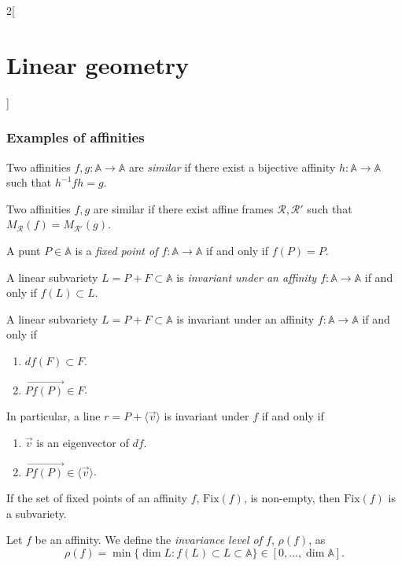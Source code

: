 \documentclass[class=article,10pt,crop=false]{standalone}
\begin{document}
\begin{multicols}{2}[\section{Linear geometry}]
\subsubsection*{Examples of affinities}
\begin{definition}
Two affinities $f,g:\mathbb{A}\rightarrow\mathbb{A}$ are \textit{similar} if there exist a bijective affinity $h:\mathbb{A}\rightarrow\mathbb{A}$ such that $h^{-1}fh=g$.
\end{definition}
\begin{prop}
Two affinities $f,g$ are similar if there exist affine frames $\mathcal{R},\mathcal{R}'$ such that $M_\mathcal{R}(f)=M_{\mathcal{R}'}(g)$.
\end{prop}
\begin{definition}
A punt $P\in\mathbb{A}$ is a \textit{fixed point of $f:\mathbb{A}\rightarrow\mathbb{A}$} if and only if $f(P)=P$.
\end{definition}
\begin{definition}
A linear subvariety $L=P+F\subset\mathbb{A}$ is \textit{invariant under an affinity $f:\mathbb{A}\rightarrow\mathbb{A}$} if and only if $f(L)\subset L$.
\end{definition}
\begin{prop}
A linear subvariety $L=P+F\subset\mathbb{A}$ is invariant under an affinity $f:\mathbb{A}\rightarrow\mathbb{A}$ if and only if
\begin{enumerate}
    \item $df(F)\subset F$.
    \item $\overrightarrow{Pf(P)}\in F$.
\end{enumerate} In particular, a line $r=P+\langle\overrightarrow{v}\rangle$ is invariant under $f$ if and only if
\begin{enumerate}
    \item $\overrightarrow{v}$ is an eigenvector of $df$.
    \item $\overrightarrow{Pf(P)}\in\langle\overrightarrow{v}\rangle$.
\end{enumerate}
\end{prop}
\begin{prop}
If the set of fixed points of an affinity $f$, $\text{Fix}(f)$, is non-empty, then $\text{Fix}(f)$ is a subvariety.
\end{prop}
\begin{definition}
Let $f$ be an affinity. We define the \textit{invariance level of $f$}, $\rho(f)$, as $$\rho(f)=\min\{\dim L:f(L)\subset L\subset\mathbb{A}\}\in[0,\ldots,\dim\mathbb{A}].$$  
\end{definition}

\end{multicols}
\end{document}
